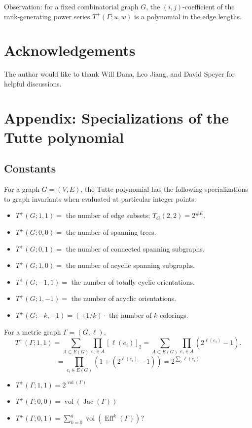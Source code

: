 \documentclass{amsart}
\theoremstyle{definition}
\DeclareMathOperator{\Eff}{Eff}
\DeclareMathOperator{\Jac}{Jac}
\DeclareMathOperator{\vol}{vol}
\begin{document}
Observation: for a fixed combinatorial graph $G$, the $(i,j)$-coefficient of the rank-generating power series $T^+(\Gamma; u,w)$ is a polynomial in the edge lengths.

\section*{Acknowledgements}
The author would like to thank 
Will Dana, Leo Jiang, and
David Speyer for helpful discussions.

\section*{Appendix: Specializations of the Tutte polynomial}

\subsection{Constants}
For a graph $G = (V,E)$, the Tutte polynomial has the following specializations to graph invariants when evaluated at particular integer points.

\begin{itemize}
\item 
$T^+(G;1,1)=$  the number of edge subsets;
$T_G(2,2) = 2^{\# E}$.

\item 
$T^+(G;0,0) =$ the number of spanning trees.

\item 
$T^+(G;0,1) =$ the number of connected spanning subgraphs.

\item 
$T^+(G;1,0) =$ the number of acyclic spanning subgraphs.

\item 
$T^+(G;-1,1) =$ the number of totally cyclic orientations.

\item 
$T^+(G;1,-1) =$ the number of acyclic orientations.

\item 
$T^+(G; -k, -1) = (\pm 1/k)\cdot$ the number of $k$-colorings.
\end{itemize}

For a metric graph $\Gamma = (G,\ell)$,
\[ T^+(\Gamma;1,1) = \sum_{A \subset E(G)} \prod_{e_i \in A} [\ell(e_i)]_{2}
= \sum_{A \subset E(G)} \prod_{e_i \in A} (2^{\ell(e_i)} - 1) .\]
\[ = \prod_{e_i \in E(G)} (1 + (2^{\ell(e_i)} - 1))
 = 2^{\sum_i \ell(e_i)}\]
\begin{itemize}
\item 
$T^+(\Gamma;1,1) = 2^{\vol(\Gamma)}$

\item 
$T^+(\Gamma;0,0) = \vol(\Jac(\Gamma))$

\item 
$T^+(\Gamma;0,1) = \sum_{k=0}^g \vol(\Eff^k(\Gamma))$?

\end{itemize}
\end{document}
